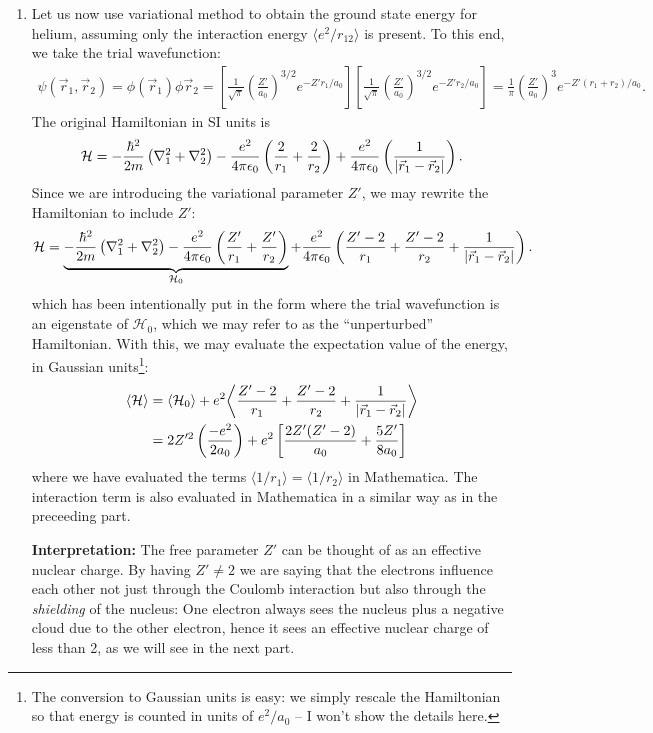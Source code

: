 \documentclass{article}
\theoremstyle{definition}
\newcommand{\ham}{\mathcal{H}}
\newcommand{\f}[2]{\frac{#1}{#2}}
\newcommand{\lp}{\left(}
\newcommand{\rp}{\right)}
\newcommand{\lb}{\left[}
\newcommand{\rb}{\right]}
\begin{document}
\begin{enumerate}[label=(\alph*)]
	\item Let us now use variational method to obtain the ground state energy for helium, assuming only the interaction energy $\langle e^2/r_{12}\rangle$ is present. To this end, we take the trial wavefunction:
	\begin{align*}
	\psi(\vec{r}_1, \vec{r}_2) = \phi(\vec{r}_1)\phi{\vec{r}_2} = \lb \f{1}{\sqrt{\pi} } \lp \f{Z'}{a_0}\rp^{3/2} e^{-Z'r_1/a_0} \rb \lb \f{1}{\sqrt{\pi} } \lp \f{Z'}{a_0}\rp^{3/2} e^{-Z'r_2/a_0} \rb = \f{1}{\pi}\lp \f{Z'}{a_0} \rp^3 e^{-Z'(r_1 + r_2)/a_0}.
	\end{align*}
	The original Hamiltonian in SI units is 
	\begin{align*}
	\ham = -\f{\hbar^2}{2m}\lp \nabla^2_1 + \nabla_2^2  \rp - \f{e^2}{4\pi \epsilon_0}\lp \f{2}{r_1} + \f{2}{r_2}\rp  +  \f{e^2}{4\pi \epsilon_0}\lp \f{1}{\abs{\vec{r}_1 - \vec{r}_2}}\rp .
	\end{align*}
	Since we are introducing the variational parameter $Z'$, we may rewrite the Hamiltonian to include $Z'$: 
	\begin{align*}
	\ham = \underbrace{-\f{\hbar^2}{2m}\lp \nabla^2_1 + \nabla_2^2  \rp - \f{e^2}{4\pi \epsilon_0}\lp \f{Z'}{r_1} + \f{Z'}{r_2}\rp}_{\ham_0}  +  \f{e^2}{4\pi \epsilon_0}\lp \f{Z'-2}{r_1} + \f{Z'-2}{r_2} + \f{1}{\abs{\vec{r}_1 - \vec{r}_2}}\rp.
	\end{align*}
	which has been intentionally put in the form where the trial wavefunction is an eigenstate of $\ham_0$, which we may refer to as the ``unperturbed'' Hamiltonian. With this, we may evaluate the expectation value of the energy, in Gaussian units\footnote{The conversion to Gaussian units is easy: we simply rescale the Hamiltonian so that energy is counted in units of $e^2/a_0$ -- I won't show the details here.}:
	\begin{align*}
	\langle \ham \rangle 
	&= \langle \ham_0 \rangle + e^2 \bigg\langle \f{Z'-2}{r_1} + \f{Z'-2}{r_2} + \f{1}{\abs{\vec{r}_1 - \vec{r}_2}} \bigg\rangle \\
	&= 2Z'^2 \lp \f{-e^2}{2a_0} \rp + e^2 \lb \f{2Z'(Z'-2)}{a_0} + \f{5Z'}{8a_0}  \rb
	\end{align*} 
	where we have evaluated the terms $\langle 1/r_1\rangle = \langle 1/r_2\rangle$ in Mathematica. The interaction term is also evaluated in Mathematica in a similar way as in the preceeding part. 
	
	
	\textbf{Interpretation:} The free parameter $Z'$ can be thought of as an effective nuclear charge. By having $Z' \neq 2$ we are saying that the electrons influence each other not just through the Coulomb interaction but also through the \textit{shielding} of the nucleus: One electron always sees the nucleus plus a negative cloud due to the other electron, hence it sees an effective nuclear charge of less than 2, as we will see in the next part.
	

\end{enumerate}
\end{document}
